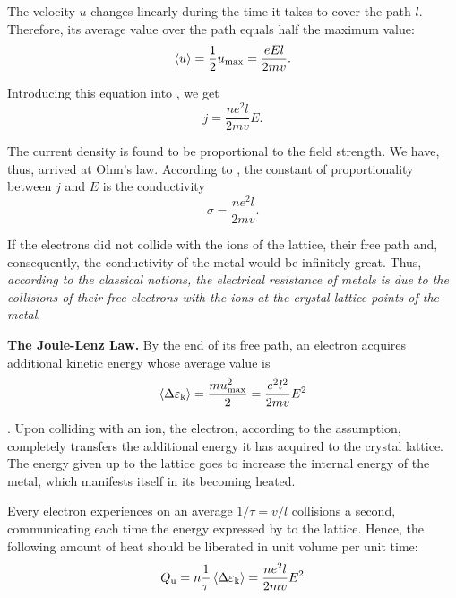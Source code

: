 \noindent
The velocity $u$ changes linearly during the time it takes to cover the path $l$.
Therefore, its average value over the path equals half the maximum value:
\begin{equation*}
    \left\langle u \right\rangle = \frac{1}{2} u_{\text{max}} = \frac{eEl}{2mv}.
\end{equation*}

\noindent
Introducing this equation into , we get
\begin{equation*}
    j = \frac{ne^2l}{2mv} E.
\end{equation*}

The current density is found to be proportional to the field strength.
We have, thus, arrived at Ohm's law.
According to , the constant of proportionality between $j$ and $E$ is the conductivity
\begin{equation}\label{eq:11_9}
    \sigma = \frac{ne^2l}{2mv}.
\end{equation}

\noindent
If the electrons did not collide with the ions of the lattice, their free path and, consequently, the conductivity of the metal would be infinitely great.
Thus, \textit{according to the classical notions, the electrical resistance of metals is due to the collisions of their free electrons with the ions at the crystal lattice points of the metal}.

\textbf{The Joule-Lenz Law.} By the end of its free path, an electron acquires additional kinetic energy whose average value is
\begin{equation}\label{eq:11_10}
    \left\langle \Delta{\varepsilon_{\text{k}}} \right\rangle = \frac{m u_{\text{max}}^2}{2} = \frac{e^2l^2}{2mv} E^2
\end{equation}

.
Upon colliding with an ion, the electron, according to the assumption, completely transfers the additional energy it has acquired to the crystal lattice.
The energy given up to the lattice goes to increase the internal energy of the metal, which manifests itself in its becoming heated.

Every electron experiences on an average $1/\tau=v/l$ collisions a second, communicating each time the energy expressed by  to the lattice.
Hence, the following amount of heat should be liberated in unit volume per unit time:
\begin{equation*}
    Q_{\text{u}} = n \frac{1}{\tau} \left\langle \Delta{\varepsilon_{\text{k}}} \right\rangle = \frac{ne^2l}{2mv} E^2
\end{equation*}

